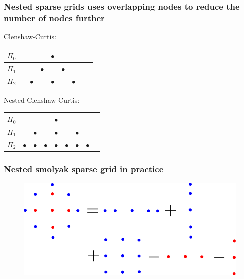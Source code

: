 \documentclass{beamer}
\begin{document}
 \begin{frame}
  \frametitle{Nested sparse grids uses overlapping nodes to reduce
  the number of nodes further}
  
  \begin{alert}
      {Clenshaw-Curtis:}\\
      \scriptsize
    \normalsize
  \begin{table}
  \begin{tabular}{lcccccccc}
    $\Pi_0$& &&& $\bullet$& &&&  \\\hline
   $\Pi_1$ &&&$\bullet$& &$\bullet$&&& \\\hline
   $\Pi_2$ &&$\bullet$&&$\bullet$ &&$\bullet$&& \\
   \end{tabular}
  \end{table}
  \end{alert}
  \pause
  \begin{alert}
      {Nested Clenshaw-Curtis:}\\
      \scriptsize
    \normalsize
  \begin{table}
  \begin{tabular}{lcccccccc}
    $\Pi_0$& &&& $\bullet$& &&&  \\\hline
   $\Pi_1$ &&$\bullet$&& $\bullet$&&$\bullet$ && \\\hline
   $\Pi_2$ &$\bullet$&$\bullet$&$\bullet$& $\bullet$&$\bullet$&$\bullet$ &$\bullet$& \\
   \end{tabular}
  \end{table}
  \end{alert}
 
  \end{frame}

\begin{frame}
 \frametitle{Nested smolyak sparse grid in practice}


 \begin{figure}
  \includegraphics[width=\textwidth]{smolyak_nested.png}
 \end{figure}

\end{frame}
\end{document}
